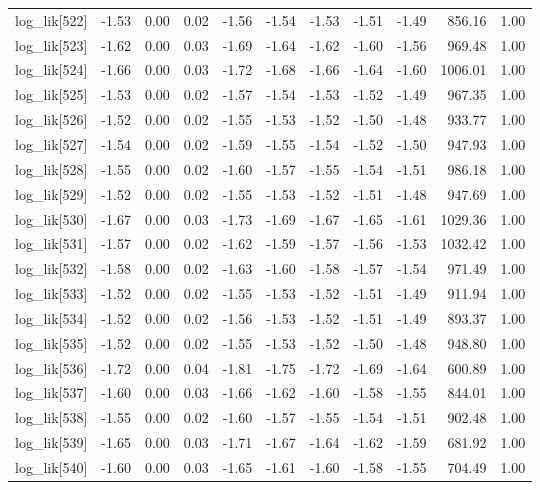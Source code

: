 \begin{table}[ht]
\begin{tabular}{rrrrrrrrrrr}
  log\_lik[522] & -1.53 & 0.00 & 0.02 & -1.56 & -1.54 & -1.53 & -1.51 & -1.49 & 856.16 & 1.00 \\ 
  log\_lik[523] & -1.62 & 0.00 & 0.03 & -1.69 & -1.64 & -1.62 & -1.60 & -1.56 & 969.48 & 1.00 \\ 
  log\_lik[524] & -1.66 & 0.00 & 0.03 & -1.72 & -1.68 & -1.66 & -1.64 & -1.60 & 1006.01 & 1.00 \\ 
  log\_lik[525] & -1.53 & 0.00 & 0.02 & -1.57 & -1.54 & -1.53 & -1.52 & -1.49 & 967.35 & 1.00 \\ 
  log\_lik[526] & -1.52 & 0.00 & 0.02 & -1.55 & -1.53 & -1.52 & -1.50 & -1.48 & 933.77 & 1.00 \\ 
  log\_lik[527] & -1.54 & 0.00 & 0.02 & -1.59 & -1.55 & -1.54 & -1.52 & -1.50 & 947.93 & 1.00 \\ 
  log\_lik[528] & -1.55 & 0.00 & 0.02 & -1.60 & -1.57 & -1.55 & -1.54 & -1.51 & 986.18 & 1.00 \\ 
  log\_lik[529] & -1.52 & 0.00 & 0.02 & -1.55 & -1.53 & -1.52 & -1.51 & -1.48 & 947.69 & 1.00 \\ 
  log\_lik[530] & -1.67 & 0.00 & 0.03 & -1.73 & -1.69 & -1.67 & -1.65 & -1.61 & 1029.36 & 1.00 \\ 
  log\_lik[531] & -1.57 & 0.00 & 0.02 & -1.62 & -1.59 & -1.57 & -1.56 & -1.53 & 1032.42 & 1.00 \\ 
  log\_lik[532] & -1.58 & 0.00 & 0.02 & -1.63 & -1.60 & -1.58 & -1.57 & -1.54 & 971.49 & 1.00 \\ 
  log\_lik[533] & -1.52 & 0.00 & 0.02 & -1.55 & -1.53 & -1.52 & -1.51 & -1.49 & 911.94 & 1.00 \\ 
  log\_lik[534] & -1.52 & 0.00 & 0.02 & -1.56 & -1.53 & -1.52 & -1.51 & -1.49 & 893.37 & 1.00 \\ 
  log\_lik[535] & -1.52 & 0.00 & 0.02 & -1.55 & -1.53 & -1.52 & -1.50 & -1.48 & 948.80 & 1.00 \\ 
  log\_lik[536] & -1.72 & 0.00 & 0.04 & -1.81 & -1.75 & -1.72 & -1.69 & -1.64 & 600.89 & 1.00 \\ 
  log\_lik[537] & -1.60 & 0.00 & 0.03 & -1.66 & -1.62 & -1.60 & -1.58 & -1.55 & 844.01 & 1.00 \\ 
  log\_lik[538] & -1.55 & 0.00 & 0.02 & -1.60 & -1.57 & -1.55 & -1.54 & -1.51 & 902.48 & 1.00 \\ 
  log\_lik[539] & -1.65 & 0.00 & 0.03 & -1.71 & -1.67 & -1.64 & -1.62 & -1.59 & 681.92 & 1.00 \\ 
  log\_lik[540] & -1.60 & 0.00 & 0.03 & -1.65 & -1.61 & -1.60 & -1.58 & -1.55 & 704.49 & 1.00 \\ 

\end{tabular}
\end{table}
